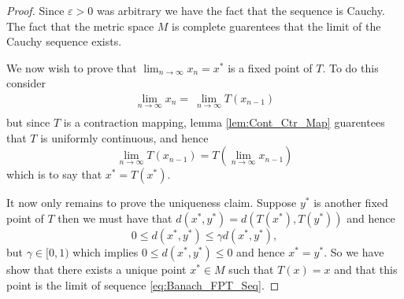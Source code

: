 \documentclass{unswmaths}
\begin{document}
\begin{proof}
	Since $ \varepsilon > 0 $ was arbitrary we have the fact that the sequence is Cauchy. The fact that the metric
	space $ M $ is complete guarentees that the limit of the Cauchy sequence exists.
	
	We now wish to prove that $ \lim_{n \longrightarrow \infty} x_n = x^* $ is a fixed point of $ T $.
	To do this consider
	\begin{align*}
		\lim_{n\longrightarrow \infty} x_n = \ \lim_{n \longrightarrow \infty} T(x_{n-1}) \\
	\end{align*}
	but since $ T $ is a contraction mapping, lemma \ref{lem:Cont_Ctr_Map} guarentees that $ T $ is 
	uniformly continuous, and hence 
	$$ \lim_{n \longrightarrow \infty } T(x_{n-1}) = T\left(\lim_{n \longrightarrow \infty} x_{n-1} \right) $$
	which is to say that $ x^* = T(x^*) $.
	
	It now only remains to prove the uniqueness claim.
	Suppose $ y^* $ is another fixed point of $ T $ then we must have that 
	$ d(x^*, y^*) = d(T(x^*),T(y^*)) $ and hence 
	$$ 0 \leq d(x^*, y^*) \leq \gamma d(x^*, y^*), $$
	but $ \gamma \in [0, 1) $ which implies $ 0 \leq d(x^*, y^*) \leq 0 $
	and hence $ x^* = y^* $.
	So we have show that there exists a unique point $ x^* \in M $ such that
	$ T(x) = x $ and that this point is the limit of sequence \eqref{eq:Banach_FPT_Seq}.
\end{proof}
\end{document}
